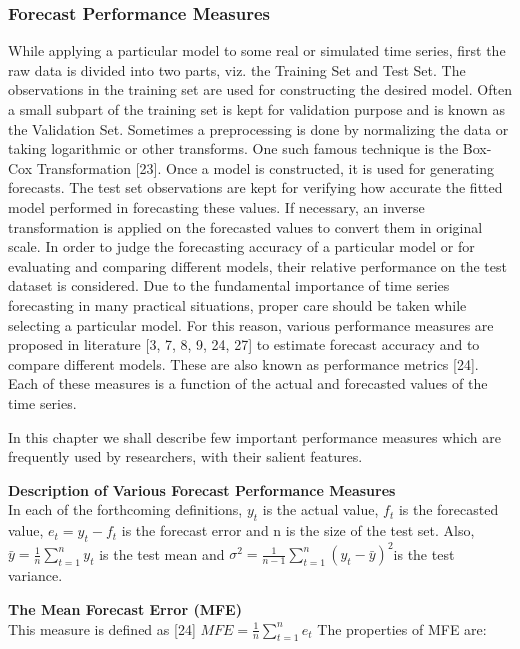 \documentclass[10pt]{report}
\begin{document}
\begin{flushleft}
		\subsubsection{Forecast Performance Measures }
		While applying a particular model to some real or 
		simulated time series, first the raw data is divided into two parts, viz. the Training Set and Test 
		Set. The observations in the training set are used for constructing the desired model. Often a 
		small subpart of the training set is kept for validation purpose and is known as the Validation 
		Set. Sometimes a preprocessing is done by normalizing the data or taking logarithmic or other 
		transforms. One such famous technique is the Box-Cox Transformation [23]. Once a model is 
		constructed, it is used for generating forecasts. The test set observations are kept for verifying 
		how accurate the fitted model performed in forecasting these values. If necessary, an inverse 
		transformation is applied on the forecasted values to convert them in original scale. In order to 
		judge the forecasting accuracy of a particular model or for evaluating and comparing different 
		models, their relative performance on the test dataset is considered. 
		Due to the fundamental importance of time series forecasting in many practical situations, 
		proper care should be taken while selecting a particular model. For this reason, various 
		performance measures are proposed in literature [3, 7, 8, 9, 24, 27] to estimate forecast 
		accuracy and to compare different models. These are also known as performance metrics [24]. 
		Each of these measures is a function of the actual and forecasted values of the time series. 
		
		
		
		In this chapter we shall describe few important performance measures which are frequently 
		used by researchers, with their salient features. 
		
		
		
		\textbf{Description of Various Forecast Performance Measures} \\
		 In each of the forthcoming definitions, $ y_{t} $ is the actual value, $ f_{t} $ is the forecasted value, $ e_{t} = y_{t} - f_{t} $ is the forecast error and n is the size of the test set. Also, $ \displaystyle \bar{y} = \frac{1}{n}\sum_{t=1}^{n}y_{t} $ is the test mean and $\displaystyle \sigma^{2} = \frac{1}{n-1}\sum_{t=1}^{n}(y_{t}-\bar{y})^{2} $is the test variance.  
		
		
		
		\textbf{The Mean Forecast Error (MFE) }\\
		This measure is defined as [24] $ \displaystyle MFE = \frac{1}{n}\sum_{t=1}^{n}e_{t} $ The properties of MFE are: 

\end{flushleft}
\end{document}
